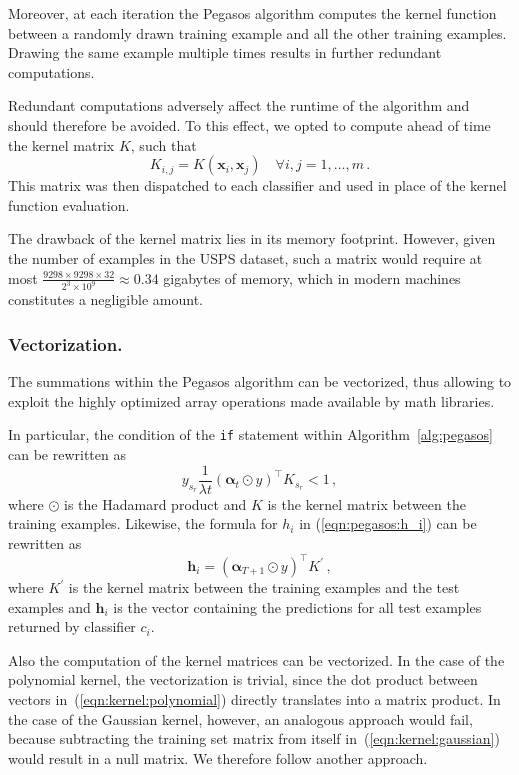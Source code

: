 \documentclass[runningheads]{llncs}
\begin{document}
Moreover, at each iteration the Pegasos algorithm computes the kernel function between a randomly drawn training example and all the other training examples. Drawing the same example multiple times results in further redundant computations.

Redundant computations adversely affect the runtime of the algorithm and should therefore be avoided. To this effect, we opted to compute ahead of time the kernel matrix $K$, such that
\[
  K_{i,j} = K(\bm{x}_i, \bm{x}_j) \quad \forall i,j=1,\dots,m \, .
\]
This matrix was then dispatched to each classifier and used in place of the kernel function evaluation.

The drawback of the kernel matrix lies in its memory footprint. However, given the number of examples in the USPS dataset, such a matrix would require at most $\frac{9298 \times 9298 \times 32}{2^3 \times 10^9} \approx 0.34$ gigabytes of memory, which in modern machines constitutes a negligible amount.  

\subsubsection{Vectorization.} The summations within the Pegasos algorithm can be vectorized, thus allowing to exploit the highly optimized array operations made available by math libraries.

In particular, the condition of the \texttt{if} statement within Algorithm~\ref{alg:pegasos} can be rewritten as
\[
  y_{s_r}\frac{1}{\lambda t} (\bm{\alpha}_t \odot y)^\top K_{s_r} < 1 \, ,
\]
where $\odot$ is the Hadamard product and $K$ is the kernel matrix between the training examples. Likewise, the formula for $h_i$ in (\ref{eqn:pegasos:h_i}) can be rewritten as
\[
  \bm{h}_i = (\bm{\alpha}_{T+1} \odot y)^\top K^\prime \, ,
\]
where $K^\prime$ is the kernel matrix between the training examples and the test examples and $\bm{h}_i$ is the vector containing the predictions for all test examples returned by classifier $c_i$.

Also the computation of the kernel matrices can be vectorized. In the case of the polynomial kernel, the vectorization is trivial, since the dot product between vectors in~(\ref{eqn:kernel:polynomial}) directly translates into a matrix product. In the case of the Gaussian kernel, however, an analogous approach would fail, because subtracting the training set matrix from itself in~(\ref{eqn:kernel:gaussian}) would result in a null matrix. We therefore follow another approach.
\end{document}
